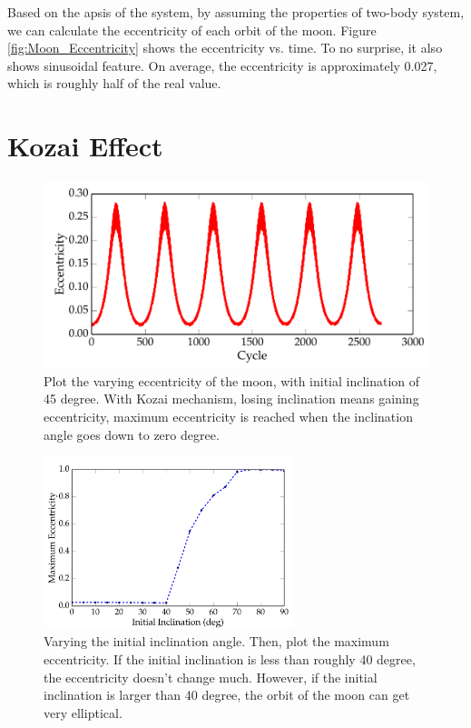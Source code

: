\documentclass[11pt,letterpaper]{article}
\begin{document}
Based on the apsis of the system, by assuming the properties of two-body system, we can calculate the eccentricity of each orbit of the moon. Figure \ref{fig:Moon_Eccentricity} shows the eccentricity vs. time. To no surprise, it also shows sinusoidal feature. On average, the eccentricity is approximately 0.027, which is roughly half of the real value.

\newpage
\section{Kozai Effect}

\begin{figure}[h!]
	\centering
	\includegraphics[height = 0.25\textheight]{Kozai_Ecc_Cycle}
	\caption{Plot the varying eccentricity of the moon, with initial inclination of 45 degree. With Kozai mechanism, losing inclination means gaining eccentricity, maximum eccentricity is reached when the inclination angle goes down to zero degree.}
	\label{fig:Kozai_Ecc_Cycle}
\end{figure}

\begin{figure}[h!]
	\centering
	\includegraphics[width = 0.65\textwidth]{Max_Ecc}
	\caption{Varying the initial inclination angle. Then, plot the maximum eccentricity. If the initial inclination is less than roughly 40 degree, the eccentricity doesn't change much. However, if the initial inclination is larger than 40 degree, the orbit of the moon can get very elliptical.}
	\label{fig:Max_Ecc}
\end{figure}
\end{document}
